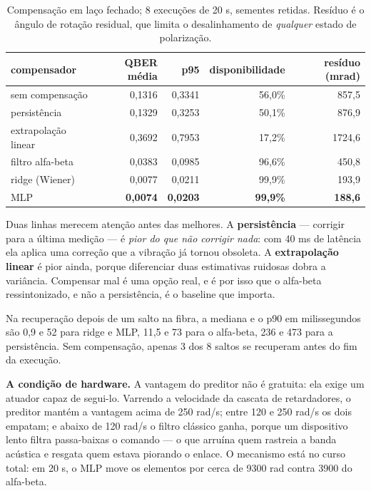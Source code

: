 \documentclass[12pt]{article}
\begin{document}
\begin{table}[ht]
\caption{Compensação em laço fechado; 8 execuções de 20 s, sementes retidas.
Resíduo é o ângulo de rotação residual, que limita o desalinhamento de
\emph{qualquer} estado de polarização.}
\label{tab:comp}
\centering
\small
\begin{tabular}{lrrrr}
\toprule
compensador & QBER média & p95 & disponibilidade & resíduo (mrad) \\
\midrule
sem compensação              & 0,1316 & 0,3341 & 56,0\% & 857,5 \\
persistência                 & 0,1329 & 0,3253 & 50,1\% & 876,9 \\
extrapolação linear          & 0,3692 & 0,7953 & 17,2\% & 1724,6 \\
filtro alfa-beta             & 0,0383 & 0,0985 & 96,6\% & 450,8 \\
ridge (Wiener)               & 0,0077 & 0,0211 & 99,9\% & 193,9 \\
MLP                          & \textbf{0,0074} & \textbf{0,0203} & \textbf{99,9\%} & \textbf{188,6} \\
\bottomrule
\end{tabular}
\end{table}

Duas linhas merecem atenção antes das melhores. A \textbf{persistência} ---
corrigir para a última medição --- é \emph{pior do que não corrigir nada}: com 40
ms de latência ela aplica uma correção que a vibração já tornou obsoleta. A
\textbf{extrapolação linear} é pior ainda, porque diferenciar duas estimativas
ruidosas dobra a variância. Compensar mal é uma opção real, e é por isso que o
alfa-beta ressintonizado, e não a persistência, é o baseline que importa.

Na recuperação depois de um salto na fibra, a mediana e o p90 em milissegundos
são 0,9 e 52 para ridge e MLP, 11,5 e 73 para o alfa-beta, 236 e 473 para a
persistência. Sem compensação, apenas 3 dos 8 saltos se recuperam antes do fim
da execução.

\textbf{A condição de hardware.} A vantagem do preditor não é gratuita: ela
exige um atuador capaz de segui-lo. Varrendo a velocidade da cascata de
retardadores, o preditor mantém a vantagem acima de 250 rad/s; entre 120 e 250
rad/s os dois empatam; e abaixo de 120 rad/s o filtro clássico ganha, porque um
dispositivo lento filtra passa-baixas o comando --- o que arruína quem rastreia
a banda acústica e resgata quem estava piorando o enlace. O mecanismo está no
curso total: em 20 s, o MLP move os elementos por cerca de 9300 rad contra 3900
do alfa-beta.
\end{document}
